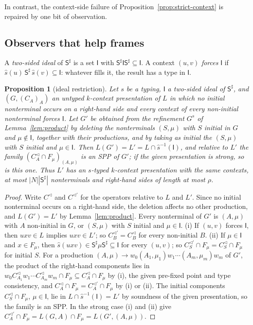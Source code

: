 \documentclass[11pt]{article}
\numberwithin{equation}{section}
\theoremstyle{plain}
\newtheorem{proposition}[theorem]{Proposition}
\theoremstyle{definition}
\theoremstyle{remark}
\theoremstyle{plain}
\newcommand{\Lc}{^{\lhd}}
\begin{document}
In contrast, the context-side failure of
Proposition~\ref{prop:strict-context} is repaired by one bit of
observation.

\subsection*{Observers that help frames}

A \emph{two-sided ideal} of $\mathsf S^\sharp$ is a set $\mathsf I$ with
$\mathsf S^\sharp\mathsf I\mathsf S^\sharp\subseteq\mathsf I$.  A context $(u,v)$
\emph{forces} $\mathsf I$ if $\widehat s(u)\,\mathsf S^\sharp\,\widehat s(v)
\subseteq\mathsf I$: whatever fills it, the result has a type in $\mathsf I$.

\begin{proposition}[ideal restriction]\label{prop:ideal}
Let $s$ be a typing, $\mathsf I$ a two-sided ideal of $\mathsf S^\sharp$, and
$(G,(C_A)_A)$ an untyped $k$-context presentation of $L$ in which no initial
nonterminal occurs on a right-hand side and every context of every
non-initial nonterminal forces $\mathsf I$.  Let $G'$ be obtained from the
refinement $G^s$ of Lemma~\ref{lem:product} by deleting the nonterminals
$(S,\mu)$ with $S$ initial in $G$ and $\mu\notin\mathsf I$, together with their
productions, and by taking as initial the $(S,\mu)$ with $S$ initial and
$\mu\in\mathsf I$.  Then $L(G')=L'=L\cap\widehat s^{-1}(\mathsf I)$,
and relative to $L'$ the family $(C_A\Lc\cap F_\mu)_{(A,\mu)}$ is an SPP of
$G'$; if the given presentation is strong, so is this one.  Thus $L'$ has an
$s$-typed $k$-context presentation with the same contexts, at most
$|N||\mathsf S^\sharp|$ nonterminals and right-hand sides of length at most
$\rho$.
\end{proposition}
\begin{proof}
Write $C\Lc$ and $C^{\lhd'}$ for the operators relative to $L$ and $L'$.
Since no initial nonterminal occurs on a right-hand side, the deletion
affects no other production, and $L(G')=L'$ by Lemma~\ref{lem:product}.  Every
nonterminal of $G'$ is $(A,\mu)$ with $A$ non-initial in $G$, or $(S,\mu)$
with $S$ initial and $\mu\in\mathsf I$.  (i) If $(u,v)$ forces $\mathsf I$,
then $uxv\in L$ implies $uxv\in L'$; so $C_B^{\lhd'}=C_B\Lc$ for every
non-initial $B$.  (ii) If $\mu\in\mathsf I$ and $x\in F_\mu$, then
$\widehat s(uxv)\in\mathsf S^\sharp\mu\mathsf S^\sharp\subseteq\mathsf I$ for every
$(u,v)$; so $C_S^{\lhd'}\cap F_\mu=C_S\Lc\cap F_\mu$ for initial $S$.  For a
production $(A,\mu)\to w_0(A_1,\mu_1)w_1\cdots(A_m,\mu_m)w_m$ of $G'$, the
product of the right-hand components lies in
$w_0C_{A_1}\Lc w_1\cdots C_{A_m}\Lc w_m\cap F_\mu\subseteq C_A\Lc\cap F_\mu$ by
(i), the given pre-fixed point and type consistency, and
$C_A\Lc\cap F_\mu=C_A^{\lhd'}\cap F_\mu$ by (i) or (ii).  The initial
components $C_S\Lc\cap F_\mu$, $\mu\in\mathsf I$, lie in
$L\cap\widehat s^{-1}(\mathsf I)=L'$ by soundness of the given presentation, so
the family is an SPP.  In the strong case (i) and (ii) give
$C_A^{\lhd'}\cap F_\mu=L(G,A)\cap F_\mu=L(G',(A,\mu))$.
\end{proof}
\end{document}
